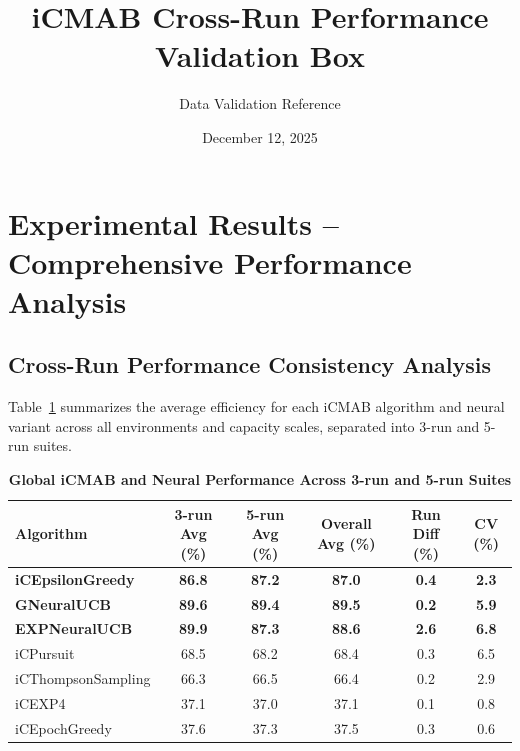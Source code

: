 \documentclass[12pt,a4paper]{article}
\title{\textbf{iCMAB Cross-Run Performance Validation Box}}
\author{Data Validation Reference}
\date{December 12, 2025}
\newcommand{\performance}[1]{\textcolor{performancecolor}{\textbf{#1}}}
\newcommand{\legacy}[1]{\textcolor{legacycolor}{\textbf{#1}}}
\newcommand{\neural}[1]{\textcolor{neuralcolor}{\textbf{#1}}}
\begin{document}
\maketitle

\section{Experimental Results – Comprehensive Performance Analysis}

\begin{tcolorbox}[colback=performancecolor!10,colframe=performancecolor,title=\textbf{Primary iCMAB Performance Results (Aggregated Across Capacities and Environments)}]
\small
\subsection{Cross-Run Performance Consistency Analysis}

Table~\ref{tab:global-performance-icmab} summarizes the average efficiency for each iCMAB algorithm and neural variant across all environments and capacity scales, separated into 3-run and 5-run suites.

\begin{table}[H]
\small
\centering
\caption{\performance{Global iCMAB and Neural Performance Across 3-run and 5-run Suites}}
\label{tab:global-performance-icmab}
\begin{tabular}{|l|c|c|c|c|c|}
\hline
\textbf{Algorithm} & \textbf{3-run Avg (\%)} & \textbf{5-run Avg (\%)} & \textbf{Overall Avg (\%)} & \textbf{Run Diff (\%)} & \textbf{CV (\%)} \\
\hline
\hline
\performance{iCEpsilonGreedy}   & \performance{86.8} & \performance{87.2} & \performance{87.0} & \performance{0.4} & \performance{2.3} \\
\neural{GNeuralUCB}            & \neural{89.6} & \neural{89.4} & \neural{89.5} & \neural{0.2} & \neural{5.9} \\
\legacy{EXPNeuralUCB}          & \legacy{89.9} & \legacy{87.3} & \legacy{88.6} & \legacy{2.6} & \legacy{6.8} \\
iCPursuit                       & 68.5 & 68.2 & 68.4 & 0.3 & 6.5 \\
iCThompsonSampling              & 66.3 & 66.5 & 66.4 & 0.2 & 2.9 \\
iCEXP4                          & 37.1 & 37.0 & 37.1 & 0.1 & 0.8 \\
iCEpochGreedy                   & 37.6 & 37.3 & 37.5 & 0.3 & 0.6 \\
\hline
\end{tabular}
\end{table}


\end{tcolorbox}
\end{document}
